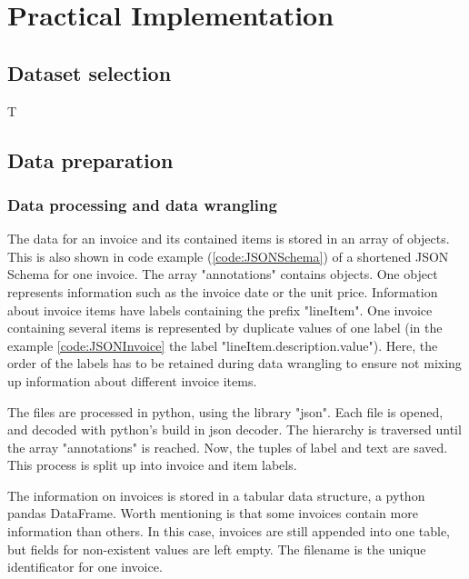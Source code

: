 \chapter{Practical Implementation}

\section{Dataset selection}
	T
	
\section{Data preparation}


	\subsection{Data processing and data wrangling}
	
	The data for an invoice and its contained items is stored in an array of objects. This is also shown in code example (\ref{code:JSONSchema}) of a shortened JSON Schema for one invoice. The array "annotations" contains objects. One object represents information such as the invoice date or the unit price. 
	Information about invoice items have labels containing the prefix "lineItem". One invoice containing several items is represented by duplicate values of one label (in the example \ref{code:JSONInvoice} the label "lineItem.description.value"). Here, the order of the labels has to be retained during data wrangling to ensure not mixing up information about different invoice items.

	
	
	The files are processed in python, using the library "json". Each file is opened, and decoded with python's build in json decoder. The hierarchy is traversed until the array "annotations" is reached. Now, the tuples of label and text are saved. This process is split up into invoice and item labels.
	
	The information on invoices is stored in a tabular data structure, a python pandas DataFrame. Worth mentioning is that some invoices contain more information than others. In this case, invoices are still appended into one table, but fields for non-existent values are left empty. The filename is the unique identificator for one invoice.
	
